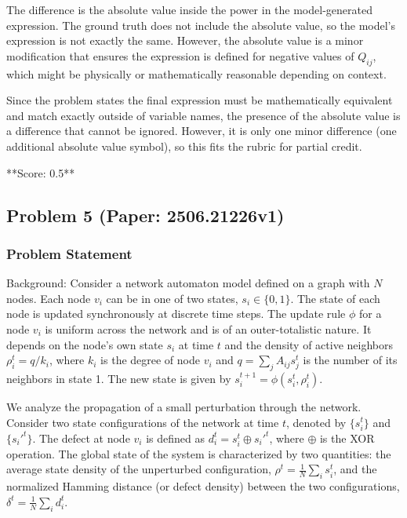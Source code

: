 \documentclass[10pt]{article}
\begin{document}
The difference is the absolute value inside the power in the model-generated expression. The ground truth does not include the absolute value, so the model's expression is not exactly the same. However, the absolute value is a minor modification that ensures the expression is defined for negative values of \( Q_{ij} \), which might be physically or mathematically reasonable depending on context. 

Since the problem states the final expression must be mathematically equivalent and match exactly outside of variable names, the presence of the absolute value is a difference that cannot be ignored. However, it is only one minor difference (one additional absolute value symbol), so this fits the rubric for partial credit.

**Score: 0.5**

\newpage
\subsection*{Problem 5 (Paper: 2506.21226v1)}
\subsubsection*{Problem Statement}
Background:
Consider a network automaton model defined on a graph with $N$ nodes. Each node $v_i$ can be in one of two states, $s_i \in \{0,1\}$. The state of each node is updated synchronously at discrete time steps. The update rule $\phi$ for a node $v_i$ is uniform across the network and is of an outer-totalistic nature. It depends on the node's own state $s_i$ at time $t$ and the density of active neighbors $\rho_i^t = q/k_i$, where $k_i$ is the degree of node $v_i$ and $q = \sum_{j} A_{ij}s_j^t$ is the number of its neighbors in state 1. The new state is given by $s_i^{t+1} = \phi(s_i^t, \rho_i^t)$.

We analyze the propagation of a small perturbation through the network. Consider two state configurations of the network at time $t$, denoted by $\{s_i^t\}$ and $\{s_i'^t\}$. The defect at node $v_i$ is defined as $d_i^t = s_i^t \oplus s_i'^t$, where $\oplus$ is the XOR operation. The global state of the system is characterized by two quantities: the average state density of the unperturbed configuration, $\rho^t = \frac{1}{N}\sum_i s_i^t$, and the normalized Hamming distance (or defect density) between the two configurations, $\delta^t = \frac{1}{N}\sum_i d_i^t$.
\end{document}
